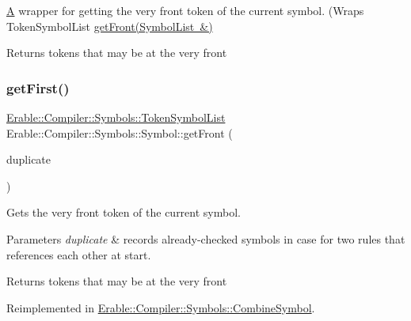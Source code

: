 \mbox{\hyperlink{class_a}{A}} wrapper for getting the very front token of the current symbol. (Wraps Token\+Symbol\+List \mbox{\hyperlink{class_erable_1_1_compiler_1_1_symbols_1_1_symbol_a59ebadb3a895ead008c23e71ac1dbc06}{get\+Front(\+Symbol\+List \&)}} \begin{DoxyReturn}{Returns}
tokens that may be at the very front 
\end{DoxyReturn}
\mbox{\label{class_erable_1_1_compiler_1_1_symbols_1_1_symbol_a59ebadb3a895ead008c23e71ac1dbc06}} 
\subsubsection{\texorpdfstring{getFirst()}{getFront()}\hspace{0.1cm}{\footnotesize\ttfamily [2/3]}}
{\footnotesize\ttfamily \mbox{\hyperlink{namespace_erable_1_1_compiler_1_1_symbols_aff1ccebebde106c3c5f3cdca118a1d69}{Erable\+::\+Compiler\+::\+Symbols\+::\+Token\+Symbol\+List}} Erable\+::\+Compiler\+::\+Symbols\+::\+Symbol\+::get\+Front (\begin{DoxyParamCaption}\item[{\mbox{\hyperlink{namespace_erable_1_1_compiler_1_1_symbols_a63e8157d2f729d4689d27bacad42f8ed}{Symbol\+List}} \&}]{duplicate }\end{DoxyParamCaption})\hspace{0.3cm}{\ttfamily [virtual]}}

Gets the very front token of the current symbol. 
\begin{DoxyParams}{Parameters}
{\em duplicate} & records already-\/checked symbols in case for two rules that references each other at start. \\
\hline
\end{DoxyParams}
\begin{DoxyReturn}{Returns}
tokens that may be at the very front 
\end{DoxyReturn}


Reimplemented in \mbox{\hyperlink{struct_erable_1_1_compiler_1_1_symbols_1_1_combine_symbol_a453595cfd8eecc98d7d6589d78068f1a}{Erable\+::\+Compiler\+::\+Symbols\+::\+Combine\+Symbol}}.

\mbox{\label{class_erable_1_1_compiler_1_1_symbols_1_1_symbol_ac92504232d5b2559963ff6b2ec1eb552}} 
